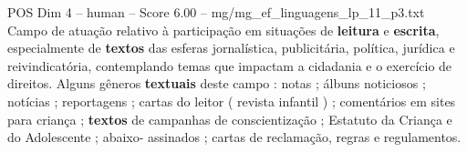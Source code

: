 \begin{textsample}{POS Dim 4 – human – Score 6.00 – mg/mg\_ef\_linguagens\_lp\_11\_p3.txt}  \label{ex:f4_pos_003}
Campo de atuação relativo à participação em situações de \textbf{leitura} e \textbf{escrita}, especialmente de \textbf{textos} das esferas jornalística, publicitária, política, jurídica e reivindicatória, contemplando temas que impactam a cidadania e o exercício de direitos.
Alguns gêneros \textbf{textuais} deste campo : notas ; álbuns noticiosos ; notícias ; reportagens ; cartas do leitor ( revista infantil ) ; comentários em sites para criança ; \textbf{textos} de campanhas de conscientização ; Estatuto da Criança e do Adolescente ; abaixo- assinados ; cartas de reclamação, regras e regulamentos.

\end{textsample}
